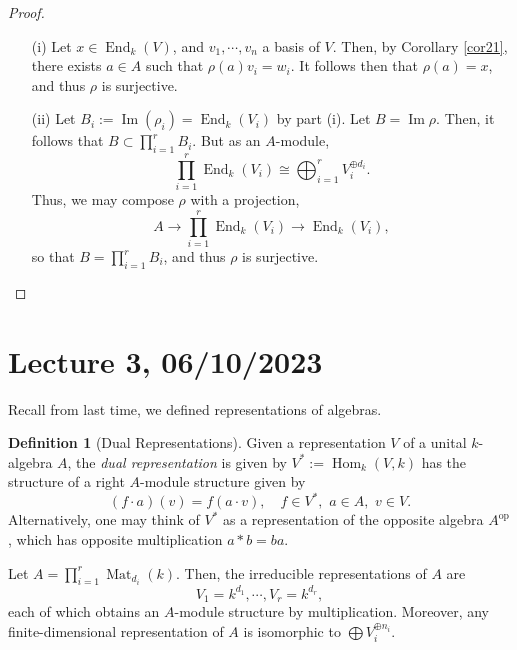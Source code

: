 \documentclass[a4paper]{report}
\theoremstyle{definition}
\newtheorem{definition}{Definition}
\theoremstyle{remark}
\theoremstyle{proposition}
\theoremstyle{conjecture}
\theoremstyle{lemma}
\theoremstyle{corollary}
\theoremstyle{exercise}
\theoremstyle{example}
\newcommand{\on}{\operatorname}
\begin{document}
\begin{proof}
    \leavevmode
    \begin{itemize}
        \item[(i)] Let $x \in \on{End}_k(V)$, and $v_1,\cdots,v_n$ a basis of 
            $V$.
            Then, by Corollary \ref{cor21}, there exists $a\in A$ such that 
            $\rho(a)v_i = w_i$. It follows then that $\rho(a) = x$,
            and thus $\rho$ is surjective.
        \item[(ii)] Let $B_i := \on{Im}(\rho_i) = \on{End}_k(V_i)$
            by part (i). Let $B = \on{Im}\rho$.
            Then, it follows that 
            $B \subset \prod_{i=1}^rB_i$. But as an $A$-module,
            $$\prod_{i=1}^r \on{End}_k(V_i) \cong \bigoplus_{i=1}^rV_i^{\oplus d_i}.$$
            Thus, we may compose $\rho$ with a projection,
            $$A \longrightarrow \prod_{i=1}^r\on{End}_k(V_i) \longrightarrow \on{End}_k(V_i),$$
            so that $B = \prod_{i=1}^rB_i$, and thus $\rho$ is surjective.
    \end{itemize}
\end{proof}

\section{Lecture 3, 06/10/2023}

Recall from last time, we defined representations of algebras.

\begin{definition}[Dual Representations]
    Given a representation $V$ of a unital $k$-algebra $A$, 
    the \emph{dual representation} is given by 
    $V^\ast := \on{Hom}_k(V,k)$ has the structure of a right
    $A$-module structure given by 
    $$(f\cdot a)(v) = f(a\cdot v),\quad f\in V^\ast,\,\,a\in A, \,\,v\in V.$$
    Alternatively, one may think of $V^\ast$ as a representation of 
    the opposite algebra $A^{\on{op}}$, which has opposite multiplication
    $a\ast b  = ba$.
\end{definition}

\begin{theorem}\label{thm24}
    Let $A = \prod_{i=1}^r\on{Mat}_{d_i}(k)$. Then, the irreducible 
    representations of $A$ are 
    $$V_1 = k^{d_1},\cdots, V_r = k^{d_r},$$
    each of which obtains an $A$-module structure by multiplication.
    Moreover, any finite-dimensional representation of $A$ is isomorphic 
    to $\bigoplus V_i^{\oplus n_i}$.
\end{theorem}
\end{document}
